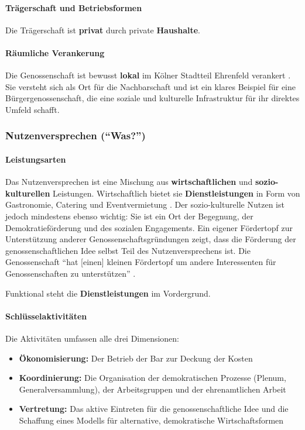\paragraph{Trägerschaft und Betriebsformen}
Die Trägerschaft ist \textbf{privat} durch private \textbf{Haushalte}.

\paragraph{Räumliche Verankerung}
Die Genossenschaft ist bewusst \textbf{lokal} im Kölner Stadtteil Ehrenfeld verankert \parencite{SatzungTRINKGENOSSE2019}. Sie versteht sich als Ort für die Nachbarschaft und ist ein klares Beispiel für eine Bürgergenossenschaft, die eine soziale und kulturelle Infrastruktur für ihr direktes Umfeld schafft.

\subsubsection{Nutzenversprechen (\enquote{Was?})}

\paragraph{Leistungsarten}
Das Nutzenversprechen ist eine Mischung aus \textbf{wirtschaftlichen} und \textbf{sozio-kulturellen} Leistungen. Wirtschaftlich bietet sie \textbf{Dienstleistungen} in Form von Gastronomie, Catering und Eventvermietung \parencite{SatzungTRINKGENOSSE2019}. Der sozio-kulturelle Nutzen ist jedoch mindestens ebenso wichtig: Sie ist ein Ort der Begegnung, der Demokratieförderung und des sozialen Engagements. Ein eigener Fördertopf zur Unterstützung anderer Genossenschaftsgründungen zeigt, dass die Förderung der genossenschaftlichen Idee selbst Teil des Nutzenversprechens ist. Die Genossenschaft \enquote{hat [einen] kleinen Fördertopf um andere Interessenten für Genossenschaften zu unterstützen} \parencite{mederInterviewZurGeschaftsmodellanalyse2025}.

Funktional steht die \textbf{Dienstleistungen} im Vordergrund.

\paragraph{Schlüsselaktivitäten}
Die Aktivitäten umfassen alle drei Dimensionen:
\begin{itemize}
\item \textbf{Ökonomisierung:} Der Betrieb der Bar zur Deckung der Kosten
\item \textbf{Koordinierung:} Die Organisation der demokratischen Prozesse (Plenum, Generalversammlung), der Arbeitsgruppen und der ehrenamtlichen Arbeit \parencite{SatzungTRINKGENOSSE2019}
\item \textbf{Vertretung:} Das aktive Eintreten für die genossenschaftliche Idee und die Schaffung eines Modells für alternative, demokratische Wirtschaftsformen
\end{itemize}

